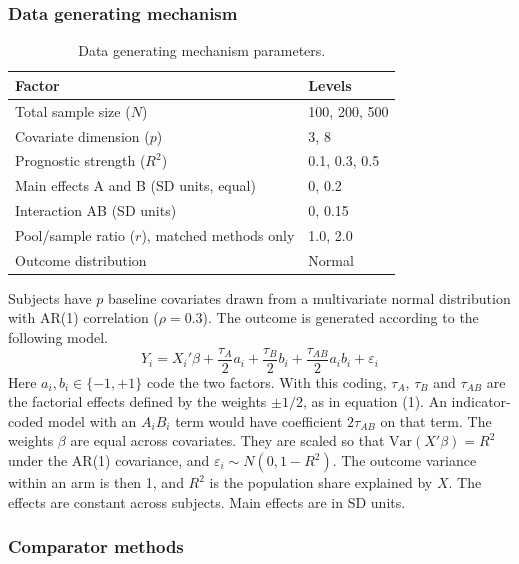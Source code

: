 \documentclass[
  11pt,
]{article}
\begin{document}
\subsubsection{Data generating mechanism}\label{data-generating-mechanism}

\begin{table}[!h]
\centering
\caption{\label{tab:dgm-params}Data generating mechanism parameters.}
\centering
\fontsize{10}{12}\selectfont
\begin{tabular}[t]{ll}
\toprule
Factor & Levels\\
\midrule
Total sample size ($N$) & 100, 200, 500\\
Covariate dimension ($p$) & 3, 8\\
Prognostic strength ($R^2$) & 0.1, 0.3, 0.5\\
Main effects A and B (SD units, equal) & 0, 0.2\\
Interaction AB (SD units) & 0, 0.15\\
\addlinespace
Pool/sample ratio ($r$), matched methods only & 1.0, 2.0\\
Outcome distribution & Normal\\
\bottomrule
\end{tabular}
\end{table}

Subjects have \(p\) baseline covariates drawn from a
multivariate normal distribution with AR(1) correlation
(\(\rho = 0.3\)). The outcome is generated according to the
following model.
\begin{equation}
  Y_i = X_i' \beta + \frac{\tau_A}{2} a_i +
    \frac{\tau_B}{2} b_i + \frac{\tau_{AB}}{2} a_i b_i +
    \varepsilon_i
\end{equation}
Here \(a_i, b_i \in \{-1, +1\}\) code the two factors. With
this coding, \(\tau_A\), \(\tau_B\) and \(\tau_{AB}\) are the
factorial effects defined by the weights \(\pm 1/2\), as in
equation (1). An indicator-coded model with an \(A_i B_i\)
term would have coefficient \(2\tau_{AB}\) on that term. The
weights \(\beta\) are equal across covariates. They are
scaled so that \(\text{Var}(X'\beta) = R^2\) under the AR(1)
covariance, and \(\varepsilon_i \sim N(0, 1 - R^2)\). The
outcome variance within an arm is then 1, and \(R^2\) is the
population share explained by \(X\). The effects are constant
across subjects. Main effects are in SD units.

\subsubsection{Comparator methods}\label{comparator-methods}
\end{document}
